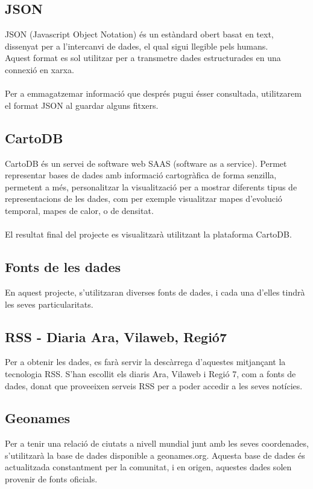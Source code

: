 \documentclass[12pt,a4paper,openright,oneside]{article}
\numberwithin{equation}{section}
\theoremstyle{definition}
\begin{document}
\subsection*{JSON}
JSON (Javascript Object Notation) és un estàndard obert basat en text, dissenyat per a l'intercanvi de dades, el qual sigui llegible pels humans.\\
Aquest format es sol utilitzar per a transmetre dades estructurades en una connexió en xarxa.\\\\
Per a emmagatzemar informació que després pugui ésser consultada, utilitzarem el format JSON al guardar alguns fitxers.\cite{json}
\subsection*{CartoDB}
CartoDB és un servei de software web SAAS (software as a service). Permet representar bases de dades amb informació cartogràfica de forma senzilla, permetent a més, personalitzar la visualització per a mostrar diferents tipus de representacions de les dades, com per exemple visualitzar mapes d'evolució temporal, mapes de calor, o de densitat.\\\\
El resultat final del projecte es visualitzarà utilitzant la plataforma CartoDB.\cite{cartodb}
\subsection{Fonts de les dades}
En aquest projecte, s'utilitzaran diverses fonts de dades, i cada una d'elles tindrà les seves particularitats.
\subsection*{RSS - Diaria Ara, Vilaweb, Regió7}
Per a obtenir les dades, es farà servir la descàrrega d'aquestes mitjançant la tecnologia RSS. S'han escollit els diaris Ara, Vilaweb i Regió 7, com a fonts de dades, donat que proveeixen serveis RSS per a poder accedir a les seves notícies.
\subsection*{Geonames}
Per a tenir una relació de ciutats a nivell mundial junt amb les seves coordenades, s'utilitzarà la base de dades disponible a geonames.org. Aquesta base de dades és actualitzada constantment per la comunitat, i en origen, aquestes dades solen provenir de fonts oficials.\cite{geonames}
\end{document}
